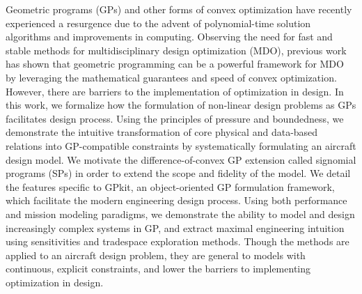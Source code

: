 % 
% 
%


Geometric programs (GPs) and other forms of convex optimization have recently experienced
a resurgence due to the advent of polynomial-time solution algorithms and improvements in computing.
Observing the need for fast and stable methods for multidisciplinary
design optimization (MDO),
previous work has shown that geometric programming can be a powerful framework
for MDO by leveraging the mathematical guarantees
and speed of convex optimization. However, there are barriers to
the implementation of optimization in design.
In this work, we formalize how the formulation
of non-linear design problems as GPs facilitates design process.
Using the principles of pressure and boundedness,
we demonstrate the intuitive transformation of core physical and
data-based relations into GP-compatible constraints by systematically formulating an aircraft
design model. We motivate the difference-of-convex GP extension called signomial programs (SPs)
in order to extend the scope and fidelity of the model.
We detail the features specific to GPkit, an object-oriented GP formulation framework, which
facilitate the modern engineering design process.
Using both performance and mission modeling paradigms, we demonstrate the ability to
model and design increasingly complex systems in GP, and extract maximal engineering intuition
using sensitivities and tradespace exploration methods.
Though the methods are applied to an aircraft design problem, they are general to
models with continuous, explicit constraints, and lower the barriers to implementing
optimization in design.

